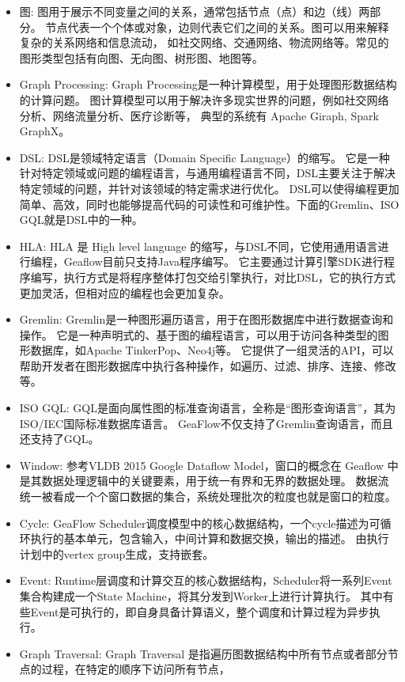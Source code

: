 \begin{itemize}
  \item 图: 图用于展示不同变量之间的关系，通常包括节点（点）和边（线）两部分。
    节点代表一个个体或对象，边则代表它们之间的关系。图可以用来解释复杂的关系网络和信息流动，
    如社交网络、交通网络、物流网络等。常见的图形类型包括有向图、无向图、树形图、地图等。
  \item Graph Processing:  Graph Processing是一种计算模型，用于处理图形数据结构的计算问题。
    图计算模型可以用于解决许多现实世界的问题，例如社交网络分析、网络流量分析、医疗诊断等，
    典型的系统有 Apache Giraph, Spark GraphX。
  \item DSL:  DSL是领域特定语言（Domain Specific Language）的缩写。
    它是一种针对特定领域或问题的编程语言，与通用编程语言不同，DSL主要关注于解决特定领域的问题，并针对该领域的特定需求进行优化。
    DSL可以使得编程更加简单、高效，同时也能够提高代码的可读性和可维护性。下面的Gremlin、ISO GQL就是DSL中的一种。
  \item HLA: HLA 是 High level language 的缩写，与DSL不同，它使用通用语言进行编程，Geaflow目前只支持Java程序编写。
    它主要通过计算引擎SDK进行程序编写，执行方式是将程序整体打包交给引擎执行，对比DSL，它的执行方式更加灵活，但相对应的编程也会更加复杂。
  \item Gremlin: Gremlin是一种图形遍历语言，用于在图形数据库中进行数据查询和操作。
    它是一种声明式的、基于图的编程语言，可以用于访问各种类型的图形数据库，如Apache TinkerPop、Neo4j等。
    它提供了一组灵活的API，可以帮助开发者在图形数据库中执行各种操作，如遍历、过滤、排序、连接、修改等。
  \item ISO GQL: GQL是面向属性图的标准查询语言，全称是“图形查询语言”，其为ISO/IEC国际标准数据库语言。
    GeaFlow不仅支持了Gremlin查询语言，而且还支持了GQL。
  \item Window: 参考VLDB 2015 Google Dataflow Model，窗口的概念在 Geaflow 中是其数据处理逻辑中的关键要素，用于统一有界和无界的数据处理。
    数据流统一被看成一个个窗口数据的集合，系统处理批次的粒度也就是窗口的粒度。
  \item Cycle: GeaFlow Scheduler调度模型中的核心数据结构，一个cycle描述为可循环执行的基本单元，包含输入，中间计算和数据交换，输出的描述。
    由执行计划中的vertex group生成，支持嵌套。
  \item Event: Runtime层调度和计算交互的核心数据结构，Scheduler将一系列Event集合构建成一个State Machine，将其分发到Worker上进行计算执行。
    其中有些Event是可执行的，即自身具备计算语义，整个调度和计算过程为异步执行。
  \item Graph Traversal: Graph Traversal 是指遍历图数据结构中所有节点或者部分节点的过程，在特定的顺序下访问所有节点，

\end{itemize}
